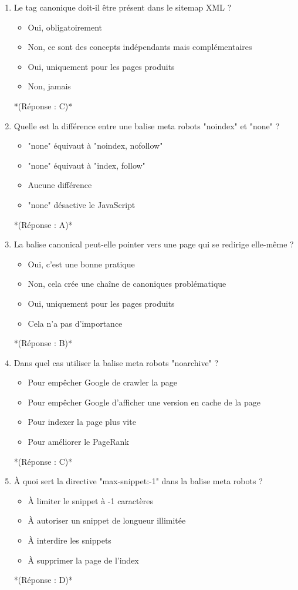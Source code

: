 \documentclass[12pt,a4paper,twoside]{report}
\begin{document}
\begin{enumerate}
\item Le tag canonique doit-il être présent dans le sitemap XML ?
\begin{itemize}
\item[A)] Oui, obligatoirement
\item[B)] Non, ce sont des concepts indépendants mais complémentaires
\item[C)] Oui, uniquement pour les pages produits
\item[D)] Non, jamais
\end{itemize}
*(Réponse : C)*

\item Quelle est la différence entre une balise meta robots "noindex" et "none" ?
\begin{itemize}
\item[A)] "none" équivaut à "noindex, nofollow"
\item[B)] "none" équivaut à "index, follow"
\item[C)] Aucune différence
\item[D)] "none" désactive le JavaScript
\end{itemize}
*(Réponse : A)*

\item La balise canonical peut-elle pointer vers une page qui se redirige elle-même ?
\begin{itemize}
\item[A)] Oui, c'est une bonne pratique
\item[B)] Non, cela crée une chaîne de canoniques problématique
\item[C)] Oui, uniquement pour les pages produits
\item[D)] Cela n'a pas d'importance
\end{itemize}
*(Réponse : B)*

\item Dans quel cas utiliser la balise meta robots "noarchive" ?
\begin{itemize}
\item[A)] Pour empêcher Google de crawler la page
\item[B)] Pour empêcher Google d'afficher une version en cache de la page
\item[C)] Pour indexer la page plus vite
\item[D)] Pour améliorer le PageRank
\end{itemize}
*(Réponse : C)*

\item À quoi sert la directive "max-snippet:-1" dans la balise meta robots ?
\begin{itemize}
\item[A)] À limiter le snippet à -1 caractères
\item[B)] À autoriser un snippet de longueur illimitée
\item[C)] À interdire les snippets
\item[D)] À supprimer la page de l'index
\end{itemize}
*(Réponse : D)*
\end{enumerate}
\end{document}
